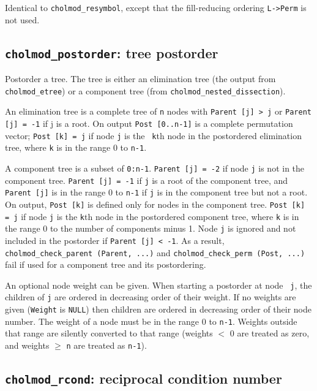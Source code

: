 \documentclass[11pt]{article}
\begin{document}

Identical to {\tt cholmod\_resymbol}, except that the fill-reducing ordering
{\tt L->Perm} is not used.

\subsection{{\tt cholmod\_postorder}: tree postorder}


Postorder a tree.  The tree is either an elimination tree (the output from {\tt
cholmod\_etree}) or a component tree (from {\tt cholmod\_nested\_dissection}).

An elimination tree is a complete tree of {\tt n} nodes with {\tt Parent [j] >
j} or {\tt Parent [j] = -1} if j is a root.  On output {\tt Post [0..n-1]} is a
complete permutation vector; {\tt Post [k] = j} if node {\tt j} is the {\tt
k}th node in the postordered elimination tree, where {\tt k} is in the range 0
to {\tt n-1}.

A component tree is a subset of {\tt 0:n-1}.  {\tt Parent [j] = -2} if node
{\tt j} is not in the component tree.  {\tt Parent [j] = -1} if {\tt j} is a
root of the component tree, and {\tt Parent [j]} is in the range 0 to {\tt n-1}
if {\tt j} is in the component tree but not a root.  On output, {\tt Post [k]}
is defined only for nodes in the component tree.  {\tt Post [k] = j} if node
{\tt j} is the {\tt k}th node in the postordered component tree, where {\tt k}
is in the range 0 to the number of components minus 1.  Node {\tt j} is ignored
and not included in the postorder if {\tt Parent [j] < -1}.  As a result, {\tt
cholmod\_check\_parent (Parent, ...)} and {\tt cholmod\_check\_perm (Post,
...)} fail if used for a component tree and its postordering.

An optional node weight can be given.  When starting a postorder at node {\tt
j}, the children of {\tt j} are ordered in decreasing order of their weight.
If no weights are given ({\tt Weight} is {\tt NULL}) then children are ordered
in decreasing order of their node number.  The weight of a node must be in the
range 0 to {\tt n-1}.  Weights outside that range are silently converted to
that range (weights $<$ 0 are treated as zero, and weights $\ge$ {\tt n} are
treated as {\tt n-1}).

\subsection{{\tt cholmod\_rcond}: reciprocal condition number}
\end{document}
